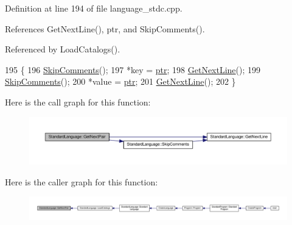 Definition at line 194 of file language\+\_\+stdc.\+cpp.



References Get\+Next\+Line(), ptr, and Skip\+Comments().



Referenced by Load\+Catalogs().


\begin{DoxyCode}
195 \{
196     \hyperlink{classStandardLanguage_af0078bbe8a06f6e4fb35ddfda1170e19}{SkipComments}();
197     *key = \hyperlink{classStandardLanguage_a4cf91a3b08223744f1ef342b0f98bb3b}{ptr};
198     \hyperlink{classStandardLanguage_a8a4a4a2879f1e907c17f36dfafdebd66}{GetNextLine}();
199     \hyperlink{classStandardLanguage_af0078bbe8a06f6e4fb35ddfda1170e19}{SkipComments}();
200     *value = \hyperlink{classStandardLanguage_a4cf91a3b08223744f1ef342b0f98bb3b}{ptr};
201     \hyperlink{classStandardLanguage_a8a4a4a2879f1e907c17f36dfafdebd66}{GetNextLine}();
202 \}
\end{DoxyCode}


Here is the call graph for this function\+:
\nopagebreak
\begin{figure}[H]
\begin{center}
\leavevmode
\includegraphics[width=350pt]{d6/db6/classStandardLanguage_ab1945e2e3503ce12eac28c0d08234cfb_cgraph}
\end{center}
\end{figure}




Here is the caller graph for this function\+:
\nopagebreak
\begin{figure}[H]
\begin{center}
\leavevmode
\includegraphics[width=350pt]{d6/db6/classStandardLanguage_ab1945e2e3503ce12eac28c0d08234cfb_icgraph}
\end{center}
\end{figure}


